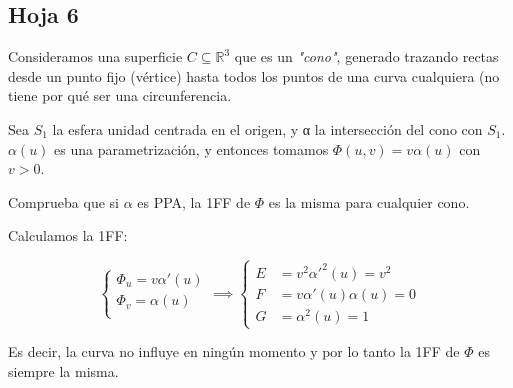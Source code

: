 \subsection{Hoja 6}

\begin{problem}[1] Consideramos una superficie $C⊆ℝ^3$ que es un \textit{"cono"}, generado trazando rectas desde un punto fijo (vértice) hasta todos los puntos de una curva cualquiera (no tiene por qué ser una circunferencia.

Sea $S_1$ la esfera unidad centrada en el origen, y α la intersección del cono con $S_1$. $α(u)$ es una parametrización, y entonces tomamos $Φ(u,v) = vα(u)$ con $v>0$.

Comprueba que si $α$ es PPA, la 1FF de $Φ$ es la misma para cualquier cono.

\solution

Calculamos la 1FF:

\[ \begin{cases}
Φ_u = vα'(u) \\
Φ_v = α(u) \\
\end{cases}\implies \begin{cases}
E &= v^2α'^2(u) = v^2 \\
F &= vα'(u)α(u) = 0\\
G &= α^2(u) = 1
\end{cases} \]

Es decir, la curva no influye en ningún momento y por lo tanto la 1FF de $Φ$ es siempre la misma.
\end{problem}

